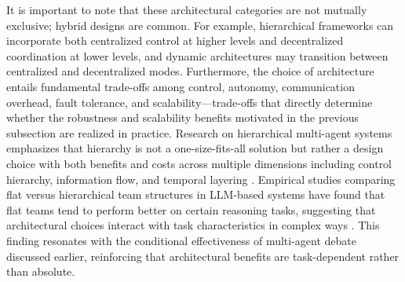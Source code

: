 \documentclass[11pt]{article}
\begin{document}
It is important to note that these architectural categories are not mutually exclusive; hybrid designs are common. For example, hierarchical frameworks can incorporate both centralized control at higher levels and decentralized coordination at lower levels, and dynamic architectures may transition between centralized and decentralized modes. Furthermore, the choice of architecture entails fundamental trade-offs among control, autonomy, communication overhead, fault tolerance, and scalability---trade-offs that directly determine whether the robustness and scalability benefits motivated in the previous subsection are realized in practice. Research on hierarchical multi-agent systems emphasizes that hierarchy is not a one-size-fits-all solution but rather a design choice with both benefits and costs across multiple dimensions including control hierarchy, information flow, and temporal layering \cite{ref46}. Empirical studies comparing flat versus hierarchical team structures in LLM-based systems have found that flat teams tend to perform better on certain reasoning tasks, suggesting that architectural choices interact with task characteristics in complex ways \cite{ref39}. This finding resonates with the conditional effectiveness of multi-agent debate discussed earlier, reinforcing that architectural benefits are task-dependent rather than absolute.
\end{document}

